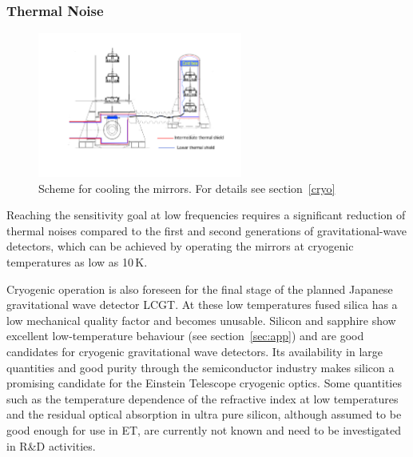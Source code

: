 \subsubsection{Thermal Noise}
\begin{figure}
\vskip -0.6cm
	\centering
		\includegraphics[width=0.6\textwidth]{./Sec_SiteInfra/Figures/ET_main-cryostat.pdf}
	\caption{Scheme for cooling the mirrors. For details see section~\ref{cryo}}
\vskip -0.1cm
\end{figure} 

Reaching the sensitivity goal at low frequencies requires a significant reduction 
of thermal noises compared to the first and second generations of gravitational-wave 
detectors, which can be achieved by operating the mirrors at cryogenic temperatures 
as low as 10\,K.  

Cryogenic operation is also foreseen for the final stage of the planned Japanese 
gravitational wave detector LCGT. At these low temperatures fused silica has a low 
mechanical quality factor and becomes unusable. Silicon and sapphire show 
excellent low-temperature behaviour (see section~\ref{sec:app}) and are good 
candidates for cryogenic gravitational wave detectors. Its availability in large 
quantities and good purity through the semiconductor industry makes silicon a 
promising candidate for the Einstein Telescope cryogenic optics. Some quantities 
such as the temperature dependence of the refractive index at low temperatures 
and the residual optical absorption in ultra pure silicon, although assumed to be 
good enough for use in ET, are currently not known and need to be 
investigated in R\&D activities.

